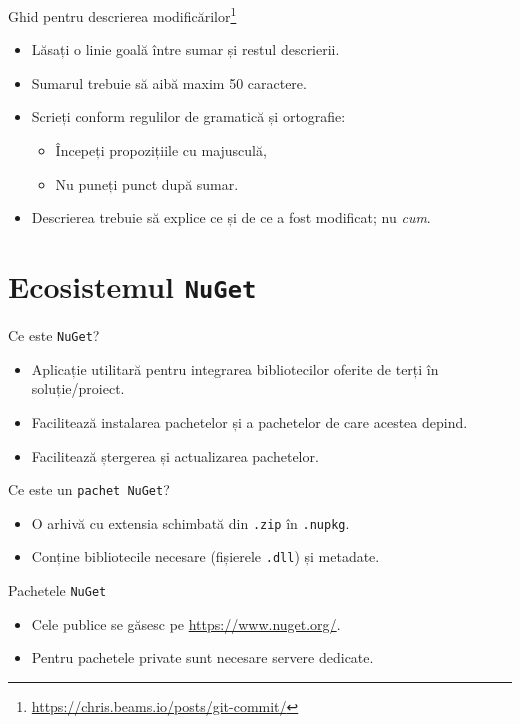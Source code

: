 \documentclass[presentation]{beamer}
\begin{document}
\begin{frame}[label={sec:org3d7e834}]{Ghid pentru descrierea modificărilor\footnote{\url{https://chris.beams.io/posts/git-commit/}}}
\begin{itemize}
\item Lăsați o linie goală între sumar și restul descrierii.
\item Sumarul trebuie să aibă maxim 50 caractere.
\item Scrieți conform regulilor de gramatică și ortografie:
\begin{itemize}
\item Începeți propozițiile cu majusculă,
\item Nu puneți punct după sumar.
\end{itemize}
\item Descrierea trebuie să explice \alert{ce} și \alert{de ce} a fost modificat; nu \emph{cum}.
\end{itemize}
\end{frame}
\section{Ecosistemul \texttt{NuGet}}
\label{sec:orgb351a84}
\begin{frame}[label={sec:orgcd05010},fragile]{Ce este \texttt{NuGet}?}
 \begin{itemize}
\item Aplicație utilitară pentru integrarea bibliotecilor oferite de terți în soluție/proiect.
\item Facilitează instalarea pachetelor și a pachetelor de care acestea depind.
\item Facilitează ștergerea și actualizarea pachetelor.
\end{itemize}
\end{frame}
\begin{frame}[label={sec:org965a327},fragile]{Ce este un \texttt{pachet NuGet}?}
 \begin{itemize}
\item O arhivă cu extensia schimbată din \texttt{.zip} în \texttt{.nupkg}.
\item Conține bibliotecile necesare (fișierele \texttt{.dll}) și metadate.
\end{itemize}
\end{frame}
\begin{frame}[label={sec:org0302c7f},fragile]{Pachetele \texttt{NuGet}}
 \begin{itemize}
\item Cele publice se găsesc pe \url{https://www.nuget.org/}.
\item Pentru pachetele private sunt necesare servere dedicate.
\end{itemize}
\end{frame}
\end{document}
